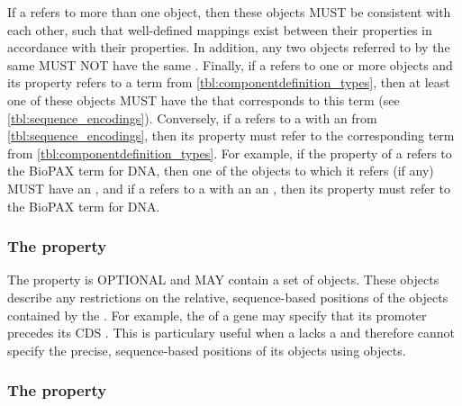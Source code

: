 If a  refers to more than one  object, then these objects MUST be consistent with each other, such that well-defined mappings exist between their  properties in accordance with their  properties. In addition, any two  objects referred to by the same  MUST NOT have the same . Finally, if a  refers to one or more  objects and its  property refers to a term from \ref{tbl:componentdefinition_types}, then at least one of these  objects MUST have the  that corresponds to this term (see \ref{tbl:sequence_encodings}).  Conversely, if a  refers to a  with an  from \ref{tbl:sequence_encodings}, then its  property must refer to the corresponding term from \ref{tbl:componentdefinition_types}. For example, if the  property of a  refers to the BioPAX term for DNA, then one of the  objects to which it refers (if any) MUST have an  , and if a  refers to a  with an an  , then its  property must refer to the BioPAX term for DNA.

\subsubsection*{The  property}
\label{sec:sequenceConstraints}

The  property is OPTIONAL and MAY contain a set of  objects. These objects describe any restrictions on the relative, sequence-based positions of the  objects contained by the . For example, the  of a gene may specify that its promoter  precedes its CDS . This is particulary useful when a  lacks a  and therefore cannot specify the precise, sequence-based positions of its  objects using  objects.

\subsubsection*{The  property}
\label{sec:sequenceAnnotations}

